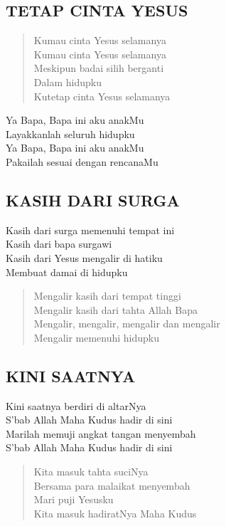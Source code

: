 
\renewcommand{\thesection}{\arabic{section}.}
\renewcommand{\thesubsection}{\arabic{subsection}.}
\newlength{\saveleftmargini} %
\setlength{\saveleftmargini}{\leftmargini} %

\subsection{TETAP CINTA YESUS} 
\begin{verse}
Kumau cinta Yesus selamanya \\
Kumau cinta Yesus selamanya \\
Meskipun badai silih berganti\\ 
Dalam hidupku\\ 
Kutetap cinta Yesus selamanya\\
\end{verse}
\begin{altverse}
Ya Bapa, Bapa ini aku anakMu \\
Layakkanlah seluruh hidupku \\
Ya Bapa, Bapa ini aku anakMu \\
Pakailah sesuai dengan rencanaMu
\end{altverse}

\subsection{KASIH DARI SURGA}
\begin{altverse}
Kasih dari surga memenuhi tempat ini \\
Kasih dari bapa surgawi \\
Kasih dari Yesus mengalir di hatiku \\
Membuat damai di hidupku 
\end{altverse}
\begin{verse}
Mengalir kasih dari tempat tinggi \\
Mengalir kasih dari tahta Allah Bapa \\
Mengalir, mengalir, mengalir dan mengalir \\
Mengalir memenuhi hidupku \\
\end{verse}

\subsection{KINI SAATNYA} 
\begin{altverse}
Kini saatnya berdiri di altarNya\\ 
S’bab Allah Maha Kudus hadir di sini\\ 
Marilah memuji angkat tangan menyembah\\ 
S’bab Allah Maha Kudus hadir di sini
\end{altverse}
\begin{verse}
Kita masuk tahta suciNya \\
Bersama para malaikat menyembah\\ 
Mari puji Yesusku \\
Kita masuk hadiratNya Maha Kudus 
\end{verse}

